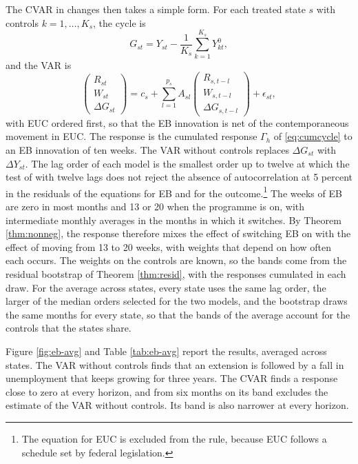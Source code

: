 \documentclass[12pt,a4paper]{article}
\theoremstyle{definition}
\begin{document}
The CVAR in changes then takes a simple form. For each treated state $s$ with controls $k=1,\dots,K_s$, the cycle is
\begin{equation}
G_{st}=Y_{st}-\frac{1}{K_s}\sum_{k=1}^{K_s}Y^0_{kt},
\end{equation}
and the VAR is
\begin{equation}
\begin{pmatrix}R_{st}\\W_{st}\\\Delta G_{st}\end{pmatrix}=c_s+\sum_{l=1}^{p_s}A_{sl}\begin{pmatrix}R_{s,t-l}\\W_{s,t-l}\\\Delta G_{s,t-l}\end{pmatrix}+\epsilon_{st},
\end{equation}
with EUC ordered first, so that the EB innovation is net of the contemporaneous movement in EUC. The response is the cumulated response $\Gamma_h$ of \eqref{eq:cumcycle} to an EB innovation of ten weeks. The VAR without controls replaces $\Delta G_{st}$ with $\Delta Y_{st}$. The lag order of each model is the smallest order up to twelve at which the test of \citet{LjungBox1978} with twelve lags does not reject the absence of autocorrelation at 5 percent in the residuals of the equations for EB and for the outcome.\footnote{The equation for EUC is excluded from the rule, because EUC follows a schedule set by federal legislation.} The weeks of EB are zero in most months and 13 or 20 when the programme is on, with intermediate monthly averages in the months in which it switches. By Theorem \ref{thm:nonneg}, the response therefore mixes the effect of switching EB on with the effect of moving from 13 to 20 weeks, with weights that depend on how often each occurs. The weights on the controls are known, so the bands come from the residual bootstrap of Theorem \ref{thm:resid}, with the responses cumulated in each draw. For the average across states, every state uses the same lag order, the larger of the median orders selected for the two models, and the bootstrap draws the same months for every state, so that the bands of the average account for the controls that the states share.

Figure \ref{fig:eb-avg} and Table \ref{tab:eb-avg} report the results, averaged across states. The VAR without controls finds that an extension is followed by a fall in unemployment that keeps growing for three years. The CVAR finds a response close to zero at every horizon, and from six months on its band excludes the estimate of the VAR without controls. Its band is also narrower at every horizon.
\end{document}
